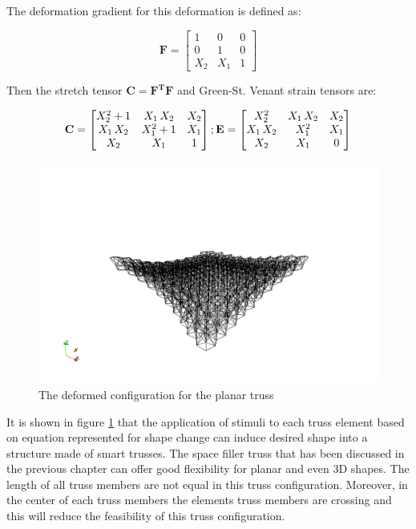 The deformation gradient for this deformation is defined as:

\begin{equation}
\mathbf F=
\begin{bmatrix}
1&0&0 \\
0&1&0 \\
X_2 & X_1 & 1
\end{bmatrix}
\label{deformation_gradient_doubly_curved_mapping:eqn}
\end{equation}

Then the stretch tensor $\mathbf C=\mathbf {F^T F}$ and Green-St. Venant strain tensors are:

\begin{equation}
\mathbf C=
\begin{bmatrix}
X_{2}^2+1&X_{1}\,
X_{2}&X_{2}\cr X_{1}\,X_{2}&X_{1}^2+1&X_{
 1}\cr X_{2}&X_{1}&1\cr 
\end{bmatrix}
; \mathbf E=
\begin{bmatrix}
X_{2}^2&X_{1}\,X_{2}&X_{2}\cr X_{1}\,X_{2}&X_{1}^2&X_{1}\cr X_{2}&X_{1}&0\cr 
 \end{bmatrix}
\label{green_deformation_tensor_doubly_curved_mapping:eqn}
\end{equation} 
  
\begin{figure} 
\centering
\includegraphics[width=5.0in]{./chap_5_active_trusses/images_space_filler/planar_truss_deformed_config.png}
\caption{The deformed configuration for the planar truss}
\label{fig:planar_truss_deformed_config}
\end{figure}

It is shown in figure \ref{fig:planar_truss_deformed_config} that the application of stimuli to each truss element based on equation represented for shape change can induce 
 desired shape into a structure made of smart trusses. 
The space filler truss that has been discussed in the previous chapter can offer good flexibility for planar and even 3D shapes. 
The length of all truss members are not equal in this truss configuration.
Moreover, in the center of each truss members the elements truss members are crossing and this will reduce the feasibility of this truss configuration.

